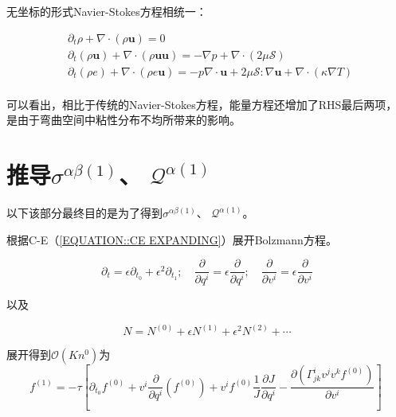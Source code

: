 \documentclass[LBMDerivation.tex]{subfiles}
\begin{document}
无坐标的形式Navier-Stokes方程相统一：


\begin{equation}
  \begin{aligned}
     & \partial_t \rho + \nabla \cdot (\rho \boldsymbol{u})=0                                                                                                                               \\
     & \partial_{t}\left(\rho \boldsymbol{u} \right)+ \nabla \cdot (\rho \boldsymbol{u} \boldsymbol{u}) = -\nabla p + \nabla \cdot ( 2\mu \mathcal{S})                                      \\
     & \partial_{t}\left(\rho e \right) + \nabla \cdot (\rho e \boldsymbol{u})= -p \nabla \cdot \boldsymbol{u} + 2\mu \mathcal{S}:\nabla \boldsymbol{u}    +  \nabla \cdot(\kappa \nabla T) \\
  \end{aligned}
  \label{EQUATION::Eluer2} ~
\end{equation}
%


可以看出，相比于传统的Navier-Stokes方程，能量方程还增加了RHS最后两项，是由于弯曲空间中粘性分布不均所带来的影响。


\appendix
\chapter{推导$\sigma^{\alpha\beta(1)}$、 $\mathcal{Q}^{\alpha (1)}$}
以下该部分最终目的是为了得到$\sigma^{\alpha\beta(1)}$、 $\mathcal{Q}^{\alpha (1)}$。


根据C-E（\ref{EQUATION::CE EXPANDING}）展开Bolzmann方程。

%
%
$$
  \partial_{t}=\epsilon \partial_{t_{0}}+\epsilon^{2} \partial_{t_{1}} ; \quad \frac{\partial}{\partial q^{i}}=\epsilon \frac{\partial}{\partial q^{i}} ; \quad \frac{\partial}{\partial v^{i}}=\epsilon \frac{\partial}{\partial v^{i}}
$$

以及

$$
  N=N^{(0)}+\epsilon N^{(1)}+\epsilon^{2} N^{(2)}+\cdots
$$
%

展开得到$\mathcal{O}\left(K n^{0}\right)$为
\begin{equation}
  f^{(1)}=-\tau\left[\partial_{t_{0}} f^{(0)}+v^{i} \frac{\partial}{\partial q^{i}}\left(f^{(0)}\right) +  v^if^{(0)} \frac{1}{J} \frac{\partial J}{\partial q^i} -\frac{\partial\left(\Gamma_{j k}^{i} v^{j} v^{k} f^{(0)}\right)}{\partial v^{i}}\right]
  \label{EQUATION::B.4} ~
\end{equation}
%
\end{document}

